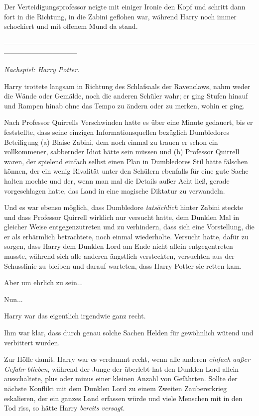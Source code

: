 {Der Verteidigungsprofessor neigte mit einiger Ironie den Kopf und schritt dann fort in die Richtung, in die Zabini geflohen war, während Harry noch immer schockiert und mit offenem Mund da stand.

--------------------------------------------------------------------------------------------------------------------------------------------

\hfill\break \emph{Nachspiel: Harry Potter.}

Harry trottete langsam in Richtung des Schlafsaals der Ravenclaws, nahm weder die Wände oder Gemälde, noch die anderen Schüler wahr; er ging Stufen hinauf und Rampen hinab ohne das Tempo zu ändern oder zu merken, wohin er ging.

Nach Professor Quirrells Verschwinden hatte es über eine Minute gedauert, bis er feststellte, dass seine einzigen Informationsquellen bezüglich Dumbledores Beteiligung (a) Blaise Zabini, dem noch einmal zu trauen er schon ein vollkommener, sabbernder Idiot hätte sein müssen und (b) Professor Quirrell waren, der spielend einfach selbst einen Plan in Dumbledores Stil hätte fälschen können, der ein wenig Rivalität unter den Schülern ebenfalls für eine gute Sache halten mochte und der, wenn man mal die Details außer Acht ließ, gerade vorgeschlagen hatte, das Land in eine magische Diktatur zu verwandeln.

Und es war ebenso möglich, dass Dumbledore \emph{tatsächlich} hinter Zabini steckte und dass Professor Quirrell wirklich nur versucht hatte, dem Dunklen Mal in gleicher Weise entgegenzutreten und zu verhindern, dass sich eine Vorstellung, die er als erbärmlich betrachtete, noch einmal wiederholte. Versucht hatte, dafür zu sorgen, dass Harry dem Dunklen Lord am Ende nicht allein entgegentreten musste, während sich alle anderen ängstlich versteckten, versuchten aus der Schusslinie zu bleiben und darauf warteten, dass Harry Potter sie retten kam.

Aber um ehrlich zu sein...

Nun...

Harry war das eigentlich irgendwie ganz recht.

Ihm war klar, dass durch genau solche Sachen Helden für gewöhnlich wütend und verbittert wurden.

Zur Hölle damit. Harry war es verdammt recht, wenn alle anderen \emph{einfach} \emph{außer Gefahr blieben}, während der Junge-der-überlebt-hat den Dunklen Lord allein ausschaltete, plus oder minus einer kleinen Anzahl von Gefährten. Sollte der nächste Konflikt mit dem Dunklen Lord zu einem Zweiten Zaubererkrieg eskalieren, der ein ganzes Land erfassen würde und viele Menschen mit in den Tod riss, so hätte Harry \emph{bereits versagt.}

}
